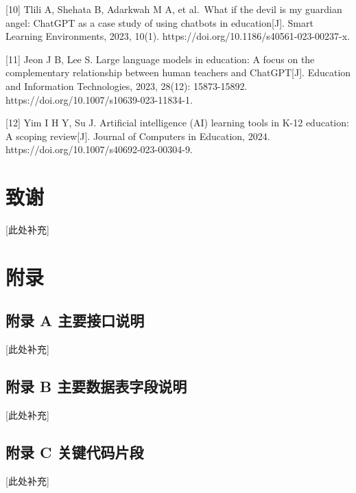 {[}10{]} Tlili A, Shehata B, Adarkwah M A, et al.~What if the devil is my guardian angel: ChatGPT as a case study of using chatbots in education{[}J{]}. Smart Learning Environments, 2023, 10(1). https://doi.org/10.1186/s40561-023-00237-x.

{[}11{]} Jeon J B, Lee S. Large language models in education: A focus on the complementary relationship between human teachers and ChatGPT{[}J{]}. Education and Information Technologies, 2023, 28(12): 15873-15892. https://doi.org/10.1007/s10639-023-11834-1.

{[}12{]} Yim I H Y, Su J. Artificial intelligence (AI) learning tools in K-12 education: A scoping review{[}J{]}. Journal of Computers in Education, 2024. https://doi.org/10.1007/s40692-023-00304-9.

\chapter*{致谢}\label{ux81f4ux8c22}

{[}此处补充{]}

\appendix\chapter{附录}\label{ux9644ux5f55}

\section{附录 A 主要接口说明}\label{ux9644ux5f55-a-ux4e3bux8981ux63a5ux53e3ux8bf4ux660e}

{[}此处补充{]}

\section{附录 B 主要数据表字段说明}\label{ux9644ux5f55-b-ux4e3bux8981ux6570ux636eux8868ux5b57ux6bb5ux8bf4ux660e}

{[}此处补充{]}

\section{附录 C 关键代码片段}\label{ux9644ux5f55-c-ux5173ux952eux4ee3ux7801ux7247ux6bb5}

{[}此处补充{]}

